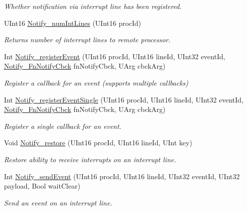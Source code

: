\begin{DoxyCompactItemize}
\begin{DoxyCompactList}\small\item\em Whether notification via interrupt line has been registered. \item\end{DoxyCompactList}\item 
UInt16 \hyperlink{_notify_8h_a195f48cdad4a2db36eb00bdbc752f8f9}{Notify\_\-numIntLines} (UInt16 procId)
\begin{DoxyCompactList}\small\item\em Returns number of interrupt lines to remote processor. \item\end{DoxyCompactList}\item 
Int \hyperlink{_notify_8h_af0e6797faaeea3d07121ad83394dd1cb}{Notify\_\-registerEvent} (UInt16 procId, UInt16 lineId, UInt32 eventId, \hyperlink{_notify_8h_ab362f7571ee3d7f7abaa743914edcd62}{Notify\_\-FnNotifyCbck} fnNotifyCbck, UArg cbckArg)
\begin{DoxyCompactList}\small\item\em Register a callback for an event (supports multiple callbacks) \item\end{DoxyCompactList}\item 
Int \hyperlink{_notify_8h_ad3d08088f515d57a3e4999a046267f49}{Notify\_\-registerEventSingle} (UInt16 procId, UInt16 lineId, UInt32 eventId, \hyperlink{_notify_8h_ab362f7571ee3d7f7abaa743914edcd62}{Notify\_\-FnNotifyCbck} fnNotifyCbck, UArg cbckArg)
\begin{DoxyCompactList}\small\item\em Register a single callback for an event. \item\end{DoxyCompactList}\item 
Void \hyperlink{_notify_8h_a07248810e2b457664a2a1f24a4179621}{Notify\_\-restore} (UInt16 procId, UInt16 lineId, UInt key)
\begin{DoxyCompactList}\small\item\em Restore ability to receive interrupts on an interrupt line. \item\end{DoxyCompactList}\item 
Int \hyperlink{_notify_8h_ac0f8b4cb2245dd897b5b75485f6b5c13}{Notify\_\-sendEvent} (UInt16 procId, UInt16 lineId, UInt32 eventId, UInt32 payload, Bool waitClear)
\begin{DoxyCompactList}\small\item\em Send an event on an interrupt line. \item\end{DoxyCompactList}\item 

\end{DoxyCompactItemize}

